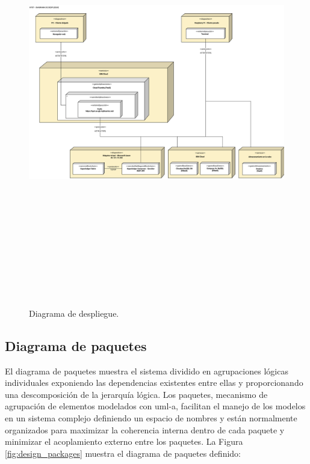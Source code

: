 \documentclass[12pt,a4paper, twoside]{report}
\begin{document}
	\begin{figure}[!ht]   
		\caption{Diagrama de despliegue.} 
		\begin{center} 
			\includegraphics[width=18cm,height=18cm]{Images/design/d_deployment.png} \\
			\label{fig:design_deployment} 
		\end{center}  
	\end{figure}	

	\subsection{Diagrama de paquetes}
	
	El diagrama de paquetes muestra el sistema dividido en agrupaciones lógicas individuales exponiendo las dependencias existentes entre ellas y proporcionando una descomposición de la jerarquía lógica. Los paquetes, mecanismo de agrupación de elementos modelados con \gls{uml-a}, facilitan el manejo de los modelos en un sistema complejo definiendo un espacio de nombres y están normalmente organizados para maximizar la coherencia interna dentro de cada paquete y minimizar el acoplamiento externo entre los paquetes. La Figura \ref{fig:design_packages} muestra el diagrama de paquetes definido:
	
\end{document}
